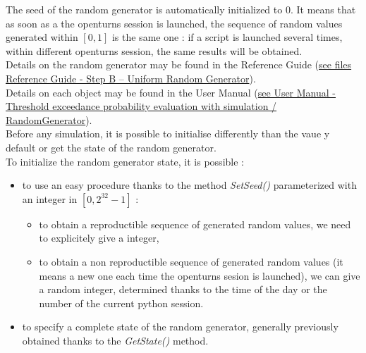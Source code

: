\renewcommand{\filename}{docUC_RandomGenerator.tex}
\renewcommand{\filetitle}{UC : Parametrisation of the Random Generator}

\HeaderIILevel

\label{randomGenerator}



The seed of the random generator is automatically initialized to 0. It means that as soon as a the openturns session is launched, the sequence of random values generated within $[0,1]$ is the same one : if a script is launched several times, within different openturns session, the same results will be obtained. \\


Details on the random generator may be found in the Reference Guide (\href{OpenTURNS_ReferenceGuide.pdf}{see files Reference Guide - Step B -- Uniform Random Generator}).\\

Details on each object may be found in the User Manual  (\href{OpenTURNS_UserManual_TUI.pdf}{see User Manual - Threshold exceedance probability evaluation with simulation / RandomGenerator}).\\


Before any simulation, it is possible to initialise differently than the vaue y default or get the state of the random generator. \\
To initialize the random generator state, it is possible :
\begin{itemize}
\item to use an easy procedure thanks to the method {\itshape SetSeed()}  parameterized with an integer in $[0, 2^{32}-1]$ :
  \begin{itemize}
  \item to obtain a reproductible sequence of generated random values, we need to explicitely give a integer,
  \item to obtain a non reproductible sequence of generated random values (it means a new one each time the openturns sesion is launched), we can give a random integer, determined thanks to the time of the day or the number of the current python session.
  \end{itemize}
\item to specify a complete state of the random generator, generally previously obtained thanks to the {\itshape GetState()} method.
\end{itemize}


